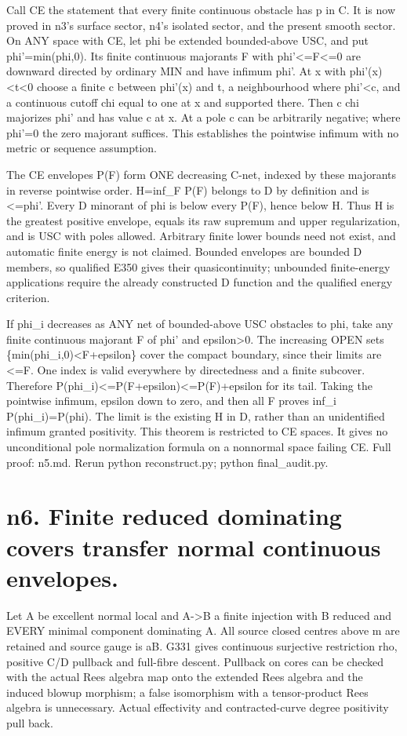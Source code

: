 \documentclass[11pt]{article}
\begin{document}
Call CE the statement that every finite continuous obstacle has p in C. It is now proved in n3's surface sector, n4's isolated sector, and the present smooth sector. On ANY space with CE, let phi be extended bounded-above USC, and put phi'=min(phi,0). Its finite continuous majorants F with phi'<=F<=0 are downward directed by ordinary MIN and have infimum phi'. At x with phi'(x)<t<0 choose a finite c between phi'(x) and t, a neighbourhood where phi'<c, and a continuous cutoff chi equal to one at x and supported there. Then c chi majorizes phi' and has value c at x. At a pole c can be arbitrarily negative; where phi'=0 the zero majorant suffices. This establishes the pointwise infimum with no metric or sequence assumption.

The CE envelopes P(F) form ONE decreasing C-net, indexed by these majorants in reverse pointwise order. H=inf\_F P(F) belongs to D by definition and is <=phi'. Every D minorant of phi is below every P(F), hence below H. Thus H is the greatest positive envelope, equals its raw supremum and upper regularization, and is USC with poles allowed. Arbitrary finite lower bounds need not exist, and automatic finite energy is not claimed. Bounded envelopes are bounded D members, so qualified E350 gives their quasicontinuity; unbounded finite-energy applications require the already constructed D function and the qualified energy criterion.

If phi\_i decreases as ANY net of bounded-above USC obstacles to phi, take any finite continuous majorant F of phi' and epsilon>0. The increasing OPEN sets \{min(phi\_i,0)<F+epsilon\} cover the compact boundary, since their limits are <=F. One index is valid everywhere by directedness and a finite subcover. Therefore P(phi\_i)<=P(F+epsilon)<=P(F)+epsilon for its tail. Taking the pointwise infimum, epsilon down to zero, and then all F proves inf\_i P(phi\_i)=P(phi). The limit is the existing H in D, rather than an unidentified infimum granted positivity. This theorem is restricted to CE spaces. It gives no unconditional pole normalization formula on a nonnormal space failing CE. Full proof: n5.md. Rerun python reconstruct.py; python final\_audit.py.

\section*{n6. Finite reduced dominating covers transfer normal continuous envelopes.}
Let A be excellent normal local and A->B a finite injection with B reduced and EVERY minimal component dominating A. All source closed centres above m are retained and source gauge is aB. G331 gives continuous surjective restriction rho, positive C/D pullback and full-fibre descent. Pullback on cores can be checked with the actual Rees algebra map onto the extended Rees algebra and the induced blowup morphism; a false isomorphism with a tensor-product Rees algebra is unnecessary. Actual effectivity and contracted-curve degree positivity pull back.
\end{document}
